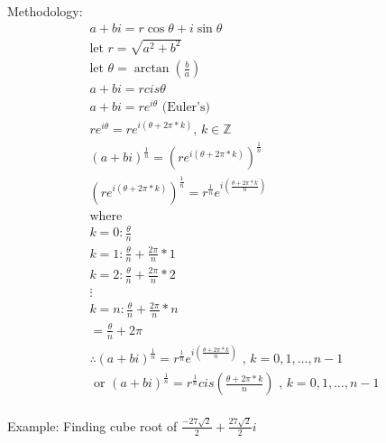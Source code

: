 Methodology:
\begin{equation}
    \begin{split}    
        a+bi = r\cos{\theta}+i\sin{\theta} \\
        \text{let $r=\sqrt{a^2+b^2}$} \\
        \text{let $\theta=\arctan\left(\frac{b}{a}\right)$} \\ 
        a+bi = rcis{\theta} \\
        a+bi = re^{i\theta} \text{ (Euler's)} \\
        re^{i\theta} = re^{i(\theta+2\pi*k)} \text {, $k$} \in \mathbb{Z} \\
        (a+bi)^{\frac{1}{n}}= (re^{i(\theta+2\pi*k)})^{\frac{1}{n}} \\
        (re^{i(\theta+2\pi*k)})^{\frac{1}{n}} = r^{\frac{1}{n}}e^{i(\frac{\theta+2\pi*k}{n})} \\
        \text{where}  \\
        k=0 : \frac{\theta}{n} \\ 
        k=1 : \frac{\theta}{n}+\frac{2\pi}{n}*1 \\
        k=2 : \frac{\theta}{n}+\frac{2\pi}{n}*2 \\
        \vdots  \\
        k=n : \frac{\theta}{n}+\frac{2\pi}{n}*n  \\    
        = \frac{\theta}{n}+2\pi \\
        \therefore (a+bi)^{\frac{1}{n}}= r^{\frac{1}{n}}e^{i(\frac{\theta+2\pi*k}{n})} \text{ , } k=0,1,\ldots,n-1 \\
        \text{ or } (a+bi)^{\frac{1}{n}}=r^{\frac{1}{n}}cis{(\frac{\theta+2\pi*k}{n})} \text{ , } k=0,1,\ldots,n-1 \\
    \end{split}
\end{equation}

Example: Finding cube root of $\frac{-27\sqrt{2}}{2}+\frac{27\sqrt{2}}{2}i$

